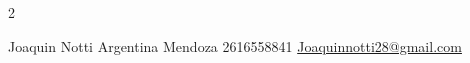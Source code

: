 \documentclass[lighthipster]{simplehipstercv}
\newlength{\rightcolwidth}
\begin{document}
\begin{paracol}{2}
\vfill{} %

\setlength{\parindent}{0pt}
\begin{minipage}[t]{\rightcolwidth}
\begin{center}\fontfamily{\sfdefault}\selectfont \color{black!70}
{\small Joaquin Notti  Argentina  Mendoza  2616558841 \newline{} \protect\url{Joaquinnotti28@gmail.com}
}
\end{center}
\end{minipage}

\end{paracol}
\end{document}
